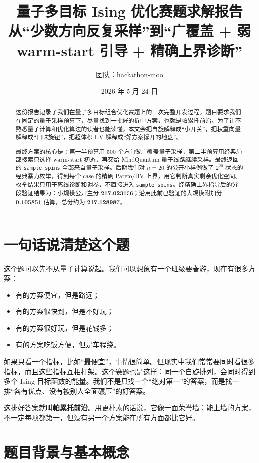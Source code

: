 \documentclass[UTF8,zihao=-4]{ctexart}
\title{\heiti 量子多目标 Ising 优化赛题求解报告\\
\large 从“少数方向反复采样”到“广覆盖 + 弱 warm-start 引导 + 精确上界诊断”}
\author{团队：hackathon-moo}
\date{2026 年 5 月 24 日}
\newcommand{\code}[1]{\texttt{#1}}
\begin{document}
\maketitle

\begin{abstract}
这份报告记录了我们在量子多目标组合优化赛题上的一次完整开发过程。题目要求我们在固定的量子采样预算下，尽量找到一批好的折中方案，也就是帕累托前沿。为了让不熟悉量子计算和优化算法的读者也能读懂，本文会把自旋解释成“小开关”，把权重向量解释成“口味旋钮”，把超体积 HV 解释成“好方案撑开的地盘”。

最终方案的核心是：第一半预算用 500 个方向做广覆盖量子采样，第二半预算用经典局部搜索只选择 warm-start 初态，再交给 MindQuantum 量子线路继续采样。最终返回的 \code{sample\_spins} 全部来自量子采样。后期我们对 \(n=20\) 的公开小样例做了 \(2^{20}\) 状态的经典暴力枚举，得到每个 case 的精确 Pareto/HV 上界，用它判断真实剩余优化空间。枚举结果只用于离线诊断和调参，不直接进入 \code{sample\_spins}。经精确上界指导后的分段验证结果为：小规模公开主分 \textbf{217.023136}；沿用此前已验证的大规模附加分 \textbf{0.105851} 估算，总分约为 \textbf{217.128987}。
\end{abstract}

\tableofcontents
\newpage

\section{一句话说清楚这个题}

这个题可以先不从量子计算说起。我们可以想象有一个班级要春游，现在有很多方案：

\begin{itemize}
  \item 有的方案便宜，但是路远；
  \item 有的方案很快到，但是不好玩；
  \item 有的方案很好玩，但是花钱多；
  \item 有的方案吃饭方便，但是车程绕。
\end{itemize}

如果只看一个指标，比如“最便宜”，事情很简单。但现实中我们常常要同时看很多指标，而且这些指标互相打架。这个赛题也是这样：同一个自旋排列，会同时得到多个 Ising 目标函数的能量。我们不是只找一个“绝对第一”的答案，而是找一排“各有优点、没有被别人全面碾压”的好答案。

这排好答案就叫\textbf{帕累托前沿}。用更朴素的话说，它像一面荣誉墙：能上墙的方案，不一定每项都第一，但没有另一个方案能在所有方面都比它好。

\section{题目背景与基本概念}
\end{document}
